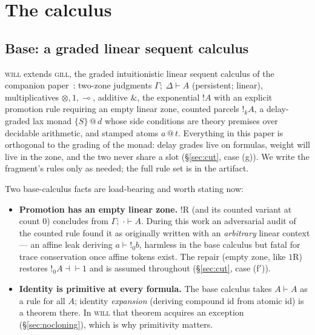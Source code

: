 \documentclass[11pt]{article}
\makeatletter
\newcommand{\lax}[2]{\{#1\}\mathbin{@}#2}       %
\newcommand{\gbang}[1]{{!}_{#1}}                 %
\newcommand{\loli}{\multimap}                    %
\newcommand{\tensor}{\otimes}                    %
\newcommand{\addconj}{\mathbin{\&}}              %
\newcommand{\bang}{{!}}                          %
\newcommand{\stmp}[2]{#1\mathbin{@}#2}           %
\newcommand{\gill}{\textsc{gill}}                %
\newcommand{\will}{\textsc{will}}                %
\newcommand{\seq}[3]{#1;\;#2\vdash #3}             %
\theoremstyle{definition}
\theoremstyle{remark}
\makeatother
\begin{document}
\section{The calculus}
\label{sec:calculus}

\subsection{Base: a graded linear sequent calculus}

\will{} extends \gill{}, the graded intuitionistic linear sequent
calculus of the companion paper~\cite{TillPaper}: two-zone judgments
$\seq{\Gamma}{\Delta}{A}$ (persistent; linear), multiplicatives
$\tensor, 1, \loli$, additive $\addconj$, the exponential $\bang A$
with an explicit promotion rule requiring an empty linear zone, counted
parcels $\gbang{k}A$, a delay-graded lax monad $\lax{S}{d}$ whose side
conditions are theory premises over decidable arithmetic, and stamped
atoms $\stmp{a}{t}$.  Everything in this paper is orthogonal to the
grading of the monad: delay grades live on formulas, weight will live
in the zone, and the two never share a slot (\S\ref{sec:cut}, case
(g)).  We write the fragment's rules only as needed; the full rule set
is in the artifact.

Two base-calculus facts are load-bearing and worth stating now:

\begin{itemize}
\item \textbf{Promotion has an empty linear zone.}
  $\bang$R (and its counted variant at count $0$) concludes from
  $\seq{\Gamma}{\cdot}{A}$.  During this work an adversarial audit of
  the counted rule found it as originally written with an
  \emph{arbitrary} linear context --- an affine leak deriving
  $a \vdash \gbang{0}b$, harmless in the base calculus but fatal for
  trace conservation once affine tokens exist.  The repair (empty zone,
  like $1$R) restores $\gbang 0 A \dashv\vdash 1$ and is assumed
  throughout (\S\ref{sec:cut}, case (f$'$)).
\item \textbf{Identity is primitive at every formula.}  The base
  calculus takes $A \vdash A$ as a rule for all $A$; identity
  \emph{expansion} (deriving compound id from atomic id) is a theorem
  there.  In \will{} that theorem acquires an exception
  (\S\ref{sec:nocloning}), which is why primitivity matters.
\end{itemize}
\end{document}
